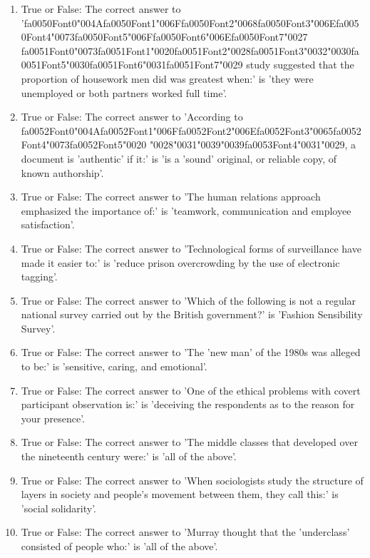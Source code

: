 \documentclass[12pt]{article}
\begin{document}
\begin{enumerate}[label=\arabic*.]
\item True or False: The correct answer to '{\csname fa0050Font0\endcsname\char"004A}{\csname fa0050Font1\endcsname\char"006F}{\csname fa0050Font2\endcsname\char"0068}{\csname fa0050Font3\endcsname\char"006E}{\csname fa0050Font4\endcsname\char"0073}{\csname fa0050Font5\endcsname\char"006F}{\csname fa0050Font6\endcsname\char"006E}{\csname fa0050Font7\endcsname\char"0027} {\csname fa0051Font0\endcsname\char"0073}{\csname fa0051Font1\endcsname\char"0020}{\csname fa0051Font2\endcsname\char"0028}{\csname fa0051Font3\endcsname\char"0032}{\char"0030}{\csname fa0051Font5\endcsname\char"0030}{\csname fa0051Font6\endcsname\char"0031}{\csname fa0051Font7\endcsname\char"0029} study suggested that the proportion of housework men did was greatest when:' is 'they were unemployed or both partners worked full time'.
\item True or False: The correct answer to 'According to {\csname fa0052Font0\endcsname\char"004A}{\csname fa0052Font1\endcsname\char"006F}{\csname fa0052Font2\endcsname\char"006E}{\csname fa0052Font3\endcsname\char"0065}{\csname fa0052Font4\endcsname\char"0073}{\csname fa0052Font5\endcsname\char"0020} {\char"0028}{\char"0031}{\char"0039}{\char"0039}{\csname fa0053Font4\endcsname\char"0031}{\char"0029}, a document is 'authentic' if it:' is 'is a 'sound' original, or reliable copy, of known authorship'.
\item True or False: The correct answer to 'The human relations approach emphasized the importance of:' is 'teamwork, communication and employee satisfaction'.
\item True or False: The correct answer to 'Technological forms of surveillance have made it easier to:' is 'reduce prison overcrowding by the use of electronic tagging'.
\item True or False: The correct answer to 'Which of the following is not a regular national survey carried out by the British government?' is 'Fashion Sensibility Survey'.
\item True or False: The correct answer to 'The 'new man' of the 1980s was alleged to be:' is 'sensitive, caring, and emotional'.
\item True or False: The correct answer to 'One of the ethical problems with covert participant observation is:' is 'deceiving the respondents as to the reason for your presence'.
\item True or False: The correct answer to 'The middle classes that developed over the nineteenth century were:' is 'all of the above'.
\item True or False: The correct answer to 'When sociologists study the structure of layers in society and people's movement between them, they call this:' is 'social solidarity'.
\item True or False: The correct answer to 'Murray thought that the 'underclass' consisted of people who:' is 'all of the above'.
\end{enumerate}
\end{document}
